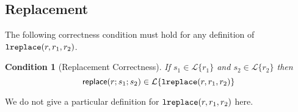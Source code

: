 \documentclass[11pt,leqno]{article}
\newtheorem{condition}[tr]{Condition}
\newtheorem{lem}[thm]{Lemma}
\theoremstyle{definition}
\newcommand{\Lagr}{\mathcal{L}}
\newcommand{\lang}[1]{\Lagr\{#1\}}
\newcommand{\stringin}[1]{{\sf stringin}[#1]}
\newcommand{\lsubst}[3]{{\sf replace}(#1;#2;#3)} %
\newcommand{\lreplace}[3]{{\sf lreplace}(#1; #2; #3)}
\renewcommand{\lreplace}[3]{{\tt lreplace}(#1, #2, #3)}
\begin{document}



\subsection{Replacement}
The following correctness condition must hold for any definition of $\lreplace{r}{r_1}{r_2}$.

\begin{condition}[Replacement Correctness] \label{thm:substcorrespondence}
  If $s_1 \in \lang{r_1}$ and $s_2 \in \lang{r_2}$ then $$\lsubst{r}{s_1}{s_2} \in \lang{\lreplace{r}{r_1}{r_2}}$$
\end{condition}

We do not give a particular definition for $\lreplace{r}{r_1}{r_2}$ here.
%
%
%
\end{document}
